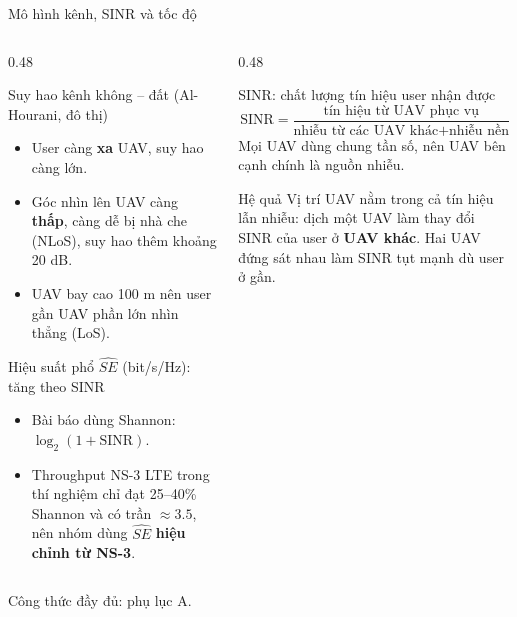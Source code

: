 \documentclass[aspectratio=169,10pt,t]{beamer}
\newcommand{\hl}[1]{\textcolor{MainBlue}{\textbf{#1}}}
\newcommand{\SE}{\widehat{SE}}
\begin{document}
\begin{frame}{Mô hình kênh, SINR và tốc độ}
\begin{columns}[T,onlytextwidth]
\begin{column}{0.48\textwidth}
\vspace{0pt}
  \begin{block}{Suy hao kênh không -- đất (Al-Hourani, đô thị)}
    \small
    \begin{itemize}
      \item User càng \textbf{xa} UAV, suy hao càng lớn.
      \item Góc nhìn lên UAV càng \textbf{thấp}, càng dễ bị nhà che (NLoS), suy hao thêm khoảng 20 dB.
      \item UAV bay cao 100 m nên user gần UAV phần lớn nhìn thẳng (LoS).
    \end{itemize}
  \end{block}
  \begin{block}{Hiệu suất phổ $\SE$ (bit/s/Hz): tăng theo SINR}
    \small
    \begin{itemize}
      \item Bài báo dùng Shannon: $\log_2(1+\mathrm{SINR})$.
      \item Throughput NS-3 LTE trong thí nghiệm chỉ đạt \alert{25--40\%} Shannon và có trần $\approx 3.5$, nên nhóm dùng $\SE$ \hl{hiệu chỉnh từ NS-3}.
    \end{itemize}
  \end{block}
\end{column}
\begin{column}{0.48\textwidth}
\vspace{0pt}
  \begin{block}{SINR: chất lượng tín hiệu user nhận được}
    \vspace{-2mm}
    \[
      \mathrm{SINR} = \frac{\text{tín hiệu từ UAV phục vụ}}{\text{nhiễu từ các UAV khác} + \text{nhiễu nền}}
    \]
    \small
    Mọi UAV dùng \alert{chung tần số}, nên UAV bên cạnh chính là nguồn nhiễu.
  \end{block}
  \begin{block}{Hệ quả}
    \small
    Vị trí UAV nằm trong cả tín hiệu lẫn nhiễu: dịch một UAV làm thay đổi SINR của user ở \textbf{UAV khác}.
    Hai UAV đứng sát nhau làm SINR tụt mạnh dù user ở gần.
  \end{block}
\end{column}
\end{columns}
\vspace{1mm}
\scriptsize Công thức đầy đủ: phụ lục A.
\end{frame}
\end{document}
